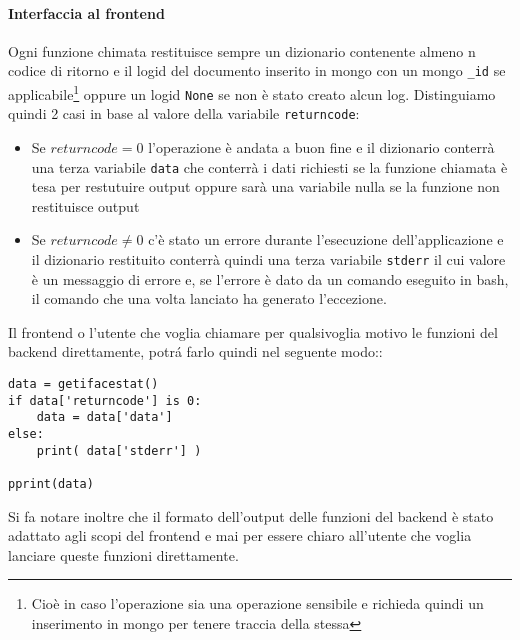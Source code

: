 \documentclass[11pt]{article}
\begin{document}
\paragraph{Interfaccia al frontend}\label{frontendinterface}
Ogni funzione chimata restituisce sempre un dizionario contenente almeno n codice di ritorno e il logid del documento inserito
in mongo con un mongo \texttt{\_id} se applicabile\footnote{\label{mongologwhen}
Cioè in caso l'operazione sia una operazione sensibile e richieda quindi un inserimento in mongo per tenere traccia della stessa}
oppure un logid \texttt{None} se non è stato creato alcun log.
Distinguiamo quindi 2 casi in base al valore della variabile \texttt{returncode}:
\begin{itemize}
	\item{Se $returncode = 0$ l'operazione è andata a buon fine e il dizionario conterrà una terza variabile \texttt{data}
		che conterrà i dati richiesti se la funzione chiamata è tesa per restutuire output oppure sarà una variabile nulla
		se la funzione non restituisce output}
	\item{Se $returncode \neq 0$ c'è stato un errore durante l'esecuzione dell'applicazione e il dizionario restituito conterrà
		quindi una terza variabile \texttt{stderr} il cui valore è un messaggio di errore e, se l'errore è dato da un comando
		eseguito in bash, il comando che una volta lanciato ha generato l'eccezione.}
\end{itemize}
Il frontend o l'utente che voglia chiamare per qualsivoglia motivo le funzioni del backend direttamente, potr\'a farlo quindi nel seguente modo::
\begin{lstlisting}
data = getifacestat()
if data['returncode'] is 0:
	data = data['data']
else:
	print( data['stderr'] )
 
pprint(data)
\end{lstlisting}
Si fa notare inoltre che il formato dell'output delle funzioni del backend è stato adattato agli scopi del frontend e mai per essere
chiaro all'utente che voglia lanciare queste funzioni direttamente.
\end{document}
